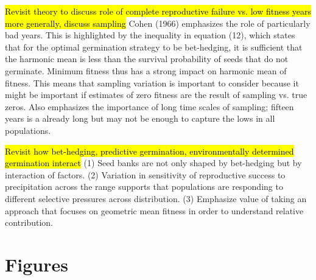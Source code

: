 \documentclass[12pt, oneside, titlepage]{article}   	%
\begin{document}
\hl{Revisit theory to discuss role of complete reproductive failure vs. low fitness years more generally, discuss sampling} Cohen (1966) emphasizes the role of particularly bad years. This is highlighted by the inequality in equation (12), which states that for the optimal germination strategy to be bet-hedging, it is sufficient that the harmonic mean is less than the survival probability of seeds that do not germinate. Minimum fitness thus has a strong impact on harmonic mean of fitness. This means that sampling variation is important to consider because it might be important if estimates of zero fitness are the result of sampling vs. true zeros. Also emphasizes the importance of long time scales of sampling; fifteen years is a already long but may not be enough to capture the lows in all populations. 

\hl{Revisit how bet-hedging, predictive germination, environmentally determined germination interact} (1) Seed banks are not only shaped by bet-hedging but by interaction of factors. (2) Variation in sensitivity of reproductive success to precipitation across the range supports that populations are responding to different selective pressures across distribution. (3) Emphasize value of taking an approach that focuses on geometric mean fitness in order to understand relative contribution.


\newpage
\clearpage
\section*{Figures} 

%
\end{document}
